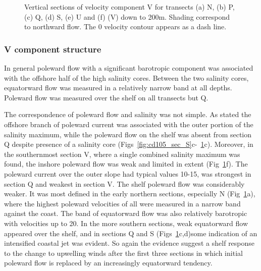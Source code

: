 \begin{figure}[!th]
\centering {}%
 
 
\caption{Vertical sections of
velocity component V for transects (a) N, (b) P, (c) Q, (d) S, (e)
U and (f) (V) down to 200m. Shading correspond to northward flow.
The 0 velocity contour appears as a dash line.}
\label{fig:cd105_sec_V}\end{figure}

\subsubsection{V component structure}
In general poleward flow with a significant barotropic component
was associated with the offshore half of the high salinity cores.
Between the two salinity cores, equatorward flow was measured in a
relatively narrow band at all depths. Poleward flow was measured
over the shelf on all transects but Q.

The correspondence of poleward flow and salinity was not simple.
As stated the offshore branch of poleward current was associated
with the outer portion of the salinity maximum, while the poleward
flow on the shelf was absent from section Q despite presence of a
salinity core
(Figs~\ref{fig:cd105_sec_S}c-~\ref{fig:cd105_sec_V}c). Moreover,
in the southernmost section V, where a single combined salinity
maximum was found, the inshore poleward flow was weak and limited
in extent (Fig~\ref{fig:cd105_sec_V}f). The poleward current over
the outer slope had typical values 10-15\velc, was strongest in
section Q and weakest in section V. The shelf poleward flow was
considerably weaker. It was most defined in the early northern
sections, especially N (Fig~\ref{fig:cd105_sec_V}a), where the
highest poleward velocities of all were measured in a narrow band
against the coast. The band of equatorward flow was also
relatively barotropic with velocities up to 20\velc. In the more
southern sections, weak equatorward flow appeared over the shelf,
and in sections Q and S (Figs~\ref{fig:cd105_sec_V}c,d)some
indication of an intensified coastal jet was evident. So again the
evidence suggest a shelf response to the change to upwelling winds
after the first three sections in which initial poleward flow is
replaced by an increasingly equatorward tendency.

